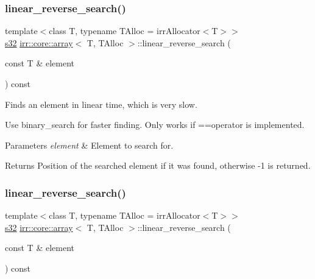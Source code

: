 \subsubsection{\texorpdfstring{linear\+\_\+reverse\+\_\+search()}{linear\_reverse\_search()}\hspace{0.1cm}{\footnotesize\ttfamily [1/2]}}
{\footnotesize\ttfamily template$<$class T, typename T\+Alloc = irr\+Allocator$<$\+T$>$$>$ \\
\hyperlink{namespaceirr_ac66849b7a6ed16e30ebede579f9b47c6}{s32} \hyperlink{classirr_1_1core_1_1array}{irr\+::core\+::array}$<$ T, T\+Alloc $>$\+::linear\+\_\+reverse\+\_\+search (\begin{DoxyParamCaption}\item[{const T \&}]{element }\end{DoxyParamCaption}) const\hspace{0.3cm}{\ttfamily [inline]}}



Finds an element in linear time, which is very slow. 

Use binary\+\_\+search for faster finding. Only works if ==operator is implemented. 
\begin{DoxyParams}{Parameters}
{\em element} & Element to search for. \\
\hline
\end{DoxyParams}
\begin{DoxyReturn}{Returns}
Position of the searched element if it was found, otherwise -\/1 is returned. 
\end{DoxyReturn}
\mbox{\label{classirr_1_1core_1_1array_aef6726fc4de8ca5a01881e09664981ad}} 
\subsubsection{\texorpdfstring{linear\+\_\+reverse\+\_\+search()}{linear\_reverse\_search()}\hspace{0.1cm}{\footnotesize\ttfamily [2/2]}}
{\footnotesize\ttfamily template$<$class T, typename T\+Alloc = irr\+Allocator$<$\+T$>$$>$ \\
\hyperlink{namespaceirr_ac66849b7a6ed16e30ebede579f9b47c6}{s32} \hyperlink{classirr_1_1core_1_1array}{irr\+::core\+::array}$<$ T, T\+Alloc $>$\+::linear\+\_\+reverse\+\_\+search (\begin{DoxyParamCaption}\item[{const T \&}]{element }\end{DoxyParamCaption}) const\hspace{0.3cm}{\ttfamily [inline]}}



